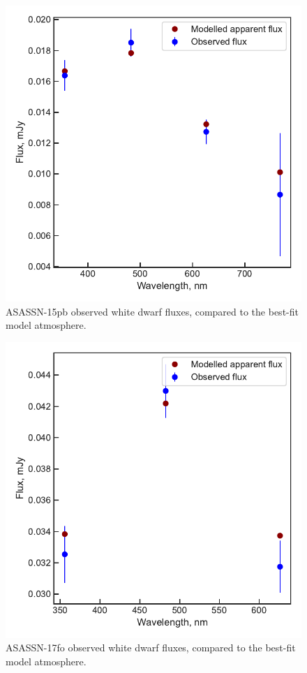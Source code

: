 \begin{figure}
    \centering
    \includegraphics[width=\textwidth]{figures/results/ASASSN-15pb/fluxplot.pdf}
    \caption{ASASSN-15pb observed white dwarf fluxes, compared to the best-fit model atmosphere.}
    \label{fig:ASASSN-15pb flux plot}
\end{figure}

\begin{figure}
    \centering
    \includegraphics[width=\textwidth]{figures/results/ASASSN-17fo/fluxplot.pdf}
    \caption{ASASSN-17fo observed white dwarf fluxes, compared to the best-fit model atmosphere.}
    \label{fig:ASASSN-17fo flux plot}
\end{figure}

